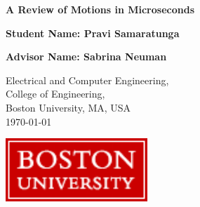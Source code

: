 \documentclass{article}
\newcommand{\todo}[1]{\textbf{\color{red}#1}}
\newcommand{\citationneeded}{\textbf{\color{blue}[Citation Needed]}}
\begin{document}
\begin{titlepage}
   \begin{center}
       \vspace*{1cm}

       \textbf{A Review of Motions in Microseconds}

            
       \vspace{1.5cm}

       \textbf{Student Name: Pravi Samaratunga}

       \textbf{Advisor Name: Sabrina Neuman}

       \vfill
            
       \vspace{0.8cm}
            
       Electrical and Computer Engineering,\\
       College of Engineering, \\
       Boston University, MA, USA \\
       \today

       \vspace{3cm}


		\vspace{2cm}
     
       \includegraphics[width=0.4\textwidth]{./assets/BU_logo.png}
            
   \end{center}
\end{titlepage}


\end{document}
